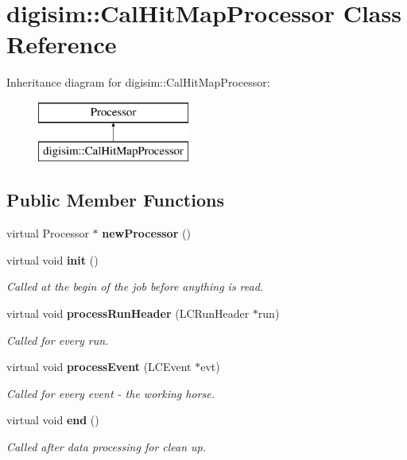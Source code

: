\section{digisim\-:\-:Cal\-Hit\-Map\-Processor Class Reference}
\label{classdigisim_1_1CalHitMapProcessor}
Inheritance diagram for digisim\-:\-:Cal\-Hit\-Map\-Processor\-:\begin{figure}[H]
\begin{center}
\leavevmode
\includegraphics[height=2.000000cm]{classdigisim_1_1CalHitMapProcessor}
\end{center}
\end{figure}
\subsection*{Public Member Functions}
\begin{DoxyCompactItemize}
\item 
virtual Processor $\ast$ {\bfseries new\-Processor} ()\label{classdigisim_1_1CalHitMapProcessor_ab73604653fce83a5209b3155f971a266}

\item 
virtual void {\bf init} ()
\begin{DoxyCompactList}\small\item\em Called at the begin of the job before anything is read. \end{DoxyCompactList}\item 
virtual void {\bf process\-Run\-Header} (L\-C\-Run\-Header $\ast$run)\label{classdigisim_1_1CalHitMapProcessor_a9493177bc62f7a9489fc24230776617d}

\begin{DoxyCompactList}\small\item\em Called for every run. \end{DoxyCompactList}\item 
virtual void {\bf process\-Event} (L\-C\-Event $\ast$evt)\label{classdigisim_1_1CalHitMapProcessor_a9bfab5f8e22f049d0aae224e1cb862dd}

\begin{DoxyCompactList}\small\item\em Called for every event -\/ the working horse. \end{DoxyCompactList}\item 
virtual void {\bf end} ()\label{classdigisim_1_1CalHitMapProcessor_a7ed5be820bbe9b75023a173dadd41143}

\begin{DoxyCompactList}\small\item\em Called after data processing for clean up. \end{DoxyCompactList}\end{DoxyCompactItemize}

